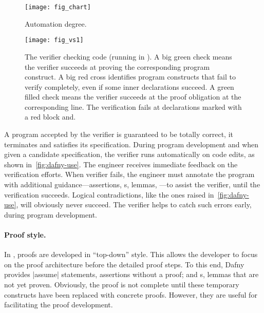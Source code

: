 \begin{figure}[ht]
\centering
\texttt{[image: fig\_chart]}
\caption[Automation degree chart]{Automation degree.}
\label{fig:dafny-auto}
\end{figure}

\begin{figure}[p]
\begin{center}
\texttt{[image: fig\_vs1]}
\end{center}
\caption[Dafny running in Visual Studio Code]{
The  verifier checking  code (running in ). A big green check{ }{ }\circledb[dafnyok]{\faCheck}{ }means the
verifier succeeds at proving the corresponding program construct. A big red
cross{ }{ }\circledb[dafnyno]{\scalebox{1.25}{\faTimes}}{ }identifies program
constructs that fail to verify completely, even if some inner declarations
succeed. A green filled check {\color{dafnyok}{\scalebox{.8}{\faCheckCircle}}}
means the verifier succeeds at the proof obligation at the corresponding line.
The verification fails at declarations marked with a red block
 and\;.
}\label{fig:dafny-use}
\end{figure}

A program accepted by the  verifier is guaranteed to be totally
correct, \ie it terminates and satisfies its
specification. During program development and when given a
candidate specification, the verifier runs automatically on code edits, as shown
in~\autoref{fig:dafny-use}. The engineer receives immediate feedback on the
verification efforts. When  verifier fails, the engineer must
annotate the program with additional guidance---assertions, s,
lemmas, \etc---to assist the verifier, until the verification succeeds. Logical
contradictions, like the ones raised in~\autoref{fig:dafny-use}, will obviously
never succeed. The verifier helps to catch such errors early, during program
development.

\paragraph*{Proof style.}
In , proofs are developed in \enquote{top-down} style. This allows
the developer to focus on the proof architecture before the detailed proof
steps. To this end, Dafny provides \pr|assume| statements, \ie assertions
without a proof; and s, \ie lemmas that are not yet proven.
Obviously, the proof is not complete until these temporary constructs have been
replaced with concrete proofs. However, they are useful for facilitating the
proof development.

